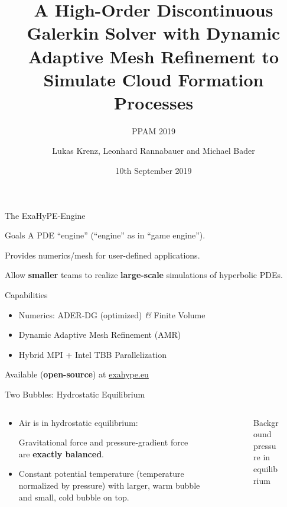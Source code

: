 \documentclass[aspectratio=169]{beamer}
\title[High-Order DG with Dynamic AMR to Simulate Clouds]{A High-Order Discontinuous Galerkin Solver with Dynamic Adaptive Mesh Refinement to Simulate Cloud Formation Processes}
\subtitle[PPAM]{PPAM 2019}
\author[Krenz, Rannabauer, Bader]{Lukas Krenz, Leonhard Rannabauer and Michael Bader}
\date{10th September 2019}
\institute{Technical University of Munich}
\begin{document}
\maketitle
\begin{frame}{The ExaHyPE-Engine}
  \begin{block}{Goals}
   A PDE \enquote{engine} (\enquote{engine} as in \enquote{game engine}).

   Provides numerics/mesh for user-defined applications.

   Allow \textbf{smaller} teams to realize \textbf{large-scale} simulations of hyperbolic PDEs.
  \end{block}
  \begin{block}{Capabilities}
    \begin{itemize}
    \item Numerics: ADER-DG (optimized) \textit{\&} Finite Volume
    \item Dynamic Adaptive Mesh Refinement (AMR)
    \item Hybrid MPI + Intel TBB Parallelization
    \end{itemize}
  \end{block}

  Available (\textbf{open-source}) at \url{exahype.eu}
\end{frame}

\begin{frame}{Two Bubbles: Hydrostatic Equilibrium}
  \begin{columns}
    \begin{column}[t]{0.5\textwidth}
      \begin{itemize}
      \item 
  Air is in hydrostatic equilibrium:

  Gravitational force and pressure-gradient force are \textbf{exactly balanced}.

  \item Constant potential temperature (temperature normalized by pressure) with larger, warm bubble and small, cold bubble on top.
      
  \end{itemize}
    \end{column}~%
    \begin{column}[t]{0.5\textwidth}
      \begin{figure}[h]
         {
        }
\caption{Background pressure in equilibrium}
\end{figure}
    \end{column}
  \end{columns}
\end{frame}
\end{document}
